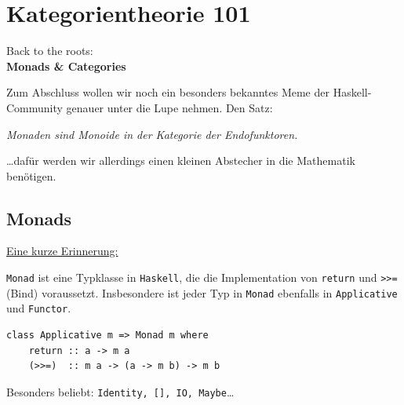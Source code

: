 \documentclass{beamer}
\begin{document}
\section*{Kategorientheorie 101}

\begin{frame}

\begin{center}
Back to the roots:\\
\Large \textbf{Monads \& Categories}
\end{center}

\end{frame}


\begin{frame}
Zum Abschluss wollen wir noch ein besonders bekanntes Meme der Haskell-Community genauer
unter die Lupe nehmen. Den Satz:

\begin{center}
\textit{\glqq Monaden sind Monoide in der Kategorie der Endofunktoren.\grqq}
\end{center}
\pause

\dots dafür werden wir allerdings einen kleinen Abstecher in die Mathematik benötigen.
\end{frame}

\subsection*{Monads}

\begin{frame}[fragile]

\underline{Eine kurze Erinnerung:}\bigskip

\texttt{Monad} ist eine Typklasse in \texttt{Haskell}, die die Implementation von \texttt{return} und \texttt{>>=} (Bind) voraussetzt. Insbesondere ist jeder Typ in \texttt{Monad} ebenfalls in \texttt{Applicative} und \texttt{Functor}.\bigskip

\begin{verbatim}
class Applicative m => Monad m where
    return :: a -> m a
    (>>=)  :: m a -> (a -> m b) -> m b
\end{verbatim}
\pause

Besonders beliebt: \texttt{Identity, [], IO, Maybe}\dots
\end{frame}
\end{document}
